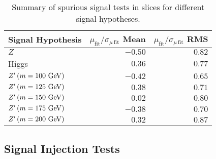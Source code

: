 \begin{table}[htpb]
 \centering
 \caption[Summary of spurious signal tests in \CRQCD{} slices for different signal hypotheses.]{%
  Summary of spurious signal tests in \CRQCD{} slices for different signal hypotheses.}
 \begin{tabular}{@{}lrr@{}}
  \toprule
  Signal Hypothesis                   & $\mu_{\mathrm{fit}}/\sigma_{\mu\,\mathrm{fit}}$ Mean & $\mu_{\mathrm{fit}}/\sigma_{\mu\,\mathrm{fit}}$ RMS \\ \midrule
  $Z$                                 & $-0.50$                                              & $0.82$                                              \\
  Higgs                               & $0.36$                                               & $0.77$                                              \\
  $Z^{\prime} \left(m = 100~\mathrm{GeV}\right)$ & $-0.42$                                              & $0.65$                                              \\
  $Z^{\prime} \left(m = 125~\mathrm{GeV}\right)$ & $0.38$                                               & $0.71$                                              \\
  $Z^{\prime} \left(m = 150~\mathrm{GeV}\right)$ & $0.02$                                               & $0.80$                                              \\
  $Z^{\prime} \left(m = 175~\mathrm{GeV}\right)$ & $-0.38$                                              & $0.70$                                              \\
  $Z^{\prime} \left(m = 200~\mathrm{GeV}\right)$ & $0.32$                                               & $0.87$                                              \\
  \bottomrule
 \end{tabular}
 \label{table:spurious_signal_test}
\end{table}

\subsection{Signal Injection Tests}\label{sec:signal_injection}

